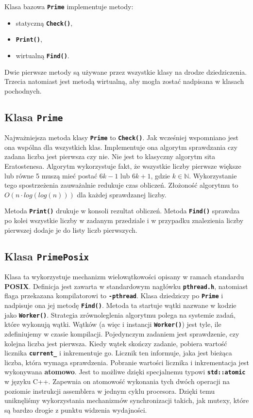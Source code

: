 \documentclass[12pt, twoside, hidelinks, a4paper]{article}
\begin{document}
Klasa bazowa \textbf{\texttt{Prime}} implementuje metody:
\begin{itemize}
\item statyczną \textbf{\texttt{Check()}},
\item \textbf{\texttt{Print()}},
\item wirtualną \textbf{\texttt{Find()}}.
\end{itemize}
Dwie pierwsze metody są używane przez wszystkie klasy na drodze dziedziczenia. Trzecia natomiast jest metodą wirtualną, aby mogła zostać nadpisana w klasach pochodnych.

\subsection{Klasa \textbf{\texttt{Prime}}}
Najważniejsza metoda klasy \textbf{\texttt{Prime}} to \textbf{\texttt{Check()}}. Jak wcześniej wspomniano jest ona wspólna dla wszystkich klas. Implementuje ona algorytm sprawdzania czy zadana liczba jest pierwsza czy nie. Nie jest to klasyczny algorytm sita Eratostenesa. Algorytm wykorzystuje fakt, że wszystkie liczby pierwsze większe lub równe 5 muszą mieć postać $6k - 1$ lub $6k + 1$, gdzie $k \in \mathbb{N}$. \cite{c1} Wykorzystanie tego spostrzeżenia zauważalnie redukuje czas obliczeń. Złożoność algorytmu to $O(n \cdot log(log(n)))$ dla każdej sprawdzanej liczby.

Metoda \textbf{\texttt{Print()}} drukuje w konsoli rezultat obliczeń.
Metoda \textbf{\texttt{Find()}} sprawdza po kolei wszystkie liczby w zadanym przedziale i w przypadku znalezienia liczby pierwszej dodaje je do listy liczb pierwszych.

\subsection{Klasa \textbf{\texttt{PrimePosix}}} \label{posixclass}
Klasa ta wykorzystuje mechanizm wielowątkowości opisany w ramach standardu \textbf{POSIX}. Definicja jest zawarta w standardowym nagłówku \textbf{\texttt{pthread.h}}, natomiast flaga przekazana kompilatorowi to \textbf{\texttt{-pthread}}. Klasa dziedziczy po \textbf{\texttt{Prime}} i nadpisuje ona jej metodę \textbf{\texttt{Find()}}. Metoda ta startuje wątki nazwane w kodzie jako \textbf{\texttt{Worker()}}. Strategia zrównoleglenia algorytmu polega na systemie zadań, które wykonują wątki. Wątków (a więc i instancji \textbf{\texttt{Worker()}}) jest tyle, ile zdefiniujemy w czasie kompilacji. Pojedynczym zadaniem jest sprawdzenie, czy kolejna liczba jest pierwsza. Kiedy wątek skończy zadanie, pobiera wartość licznika \textbf{\texttt{current\_}} i inkrementuje go. Licznik ten informuje, jaka jest bieżąca liczba, która wymaga sprawdzenia. Pobranie wartości licznika i inkrementacja jest wykonywana \textbf{atomowo}. \cite{c2} Jest to możliwe dzięki specjalnemu typowi \textbf{\texttt{std::atomic}} w języku C++. Zapewnia on atomowość wykonania tych dwóch operacji na poziomie instrukcji assemblera w jednym cyklu procesora. Dzięki temu uniknęliśmy wykorzystania mechanizmów synchronizacji takich, jak mutexy, które są bardzo drogie z punktu widzenia wydajności.
\end{document}
